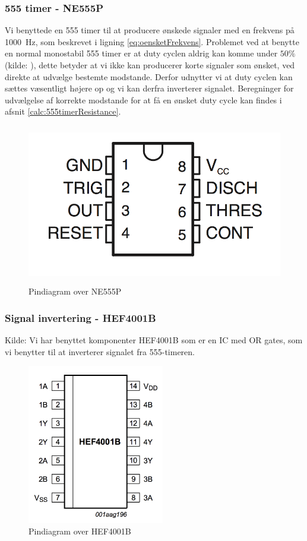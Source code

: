 \subsubsection{555 timer - NE555P}
Vi benyttede en 555 timer\cite{komp555} til at producere ønskede signaler med en frekvens på \SI{1000}{Hz}, som beskrevet i ligning \ref{eq:oensketFrekvens}.
Problemet ved at benytte en normal monostabil 555 timer er at duty cyclen aldrig kan komme under $50\%$ (kilde: \cite{555timer50percent}), dette betyder at vi ikke kan producerer korte signaler som ønsket, ved direkte at udvælge bestemte modstande. Derfor udnytter vi at duty cyclen kan sættes væsentligt højere op og vi kan derfra inverterer signalet. Beregninger for udvælgelse af korrekte modstande for at få en ønsket duty cycle kan findes i afsnit \ref{calc:555timerResistance}.

\begin{figure}[H]
	\centering
    \includegraphics[height=7cm]{figures/2_4_4hastighedsmaal/komp555pin.png}
	\caption{Pindiagram over NE555P}
	\label{fig:komp555pin}
\end{figure}

\subsubsection{Signal invertering - HEF4001B}
Kilde: \cite{kompInverter}
Vi har benyttet komponenter HEF4001B som er en IC med OR gates, som vi benytter til at inverterer signalet fra 555-timeren.



\begin{figure}[H]
	\centering
    \includegraphics[height=7cm]{figures/2_4_4hastighedsmaal/kompInverterpin.png}
	\caption{Pindiagram over HEF4001B}
	\label{fig:kompInverter}
\end{figure}


